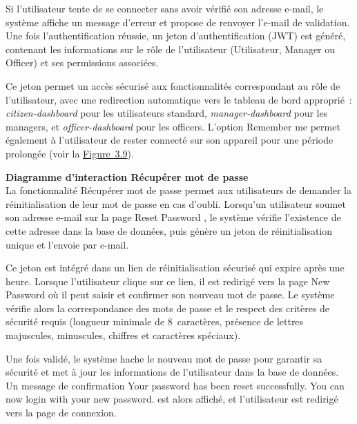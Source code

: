 \hspace{1em}Si l'utilisateur tente de se connecter sans avoir vérifié son adresse e-mail, le système affiche un message d'erreur et propose de renvoyer l'e-mail de validation. Une fois l'authentification réussie, un jeton d'authentification (JWT) est généré, contenant les informations sur le rôle de l'utilisateur (Utilisateur, Manager ou Officer) et ses permissions associées.

\hspace{1em}Ce jeton permet un accès sécurisé aux fonctionnalités correspondant au rôle de l'utilisateur, avec une redirection automatique vers le tableau de bord approprié~: \textit{citizen-dashboard} pour les utilisateurs standard, \textit{manager-dashboard} pour les managers, et \textit{officer-dashboard} pour les officers. L'option \og Remember me \fg{} permet également à l'utilisateur de rester connecté sur son appareil pour une période prolongée (voir la \hyperref[fig:3.9]{Figure~3.9}).

\medskip

\noindent\textbf{\textendash{} Diagramme d'interaction \og Récupérer mot de passe \fg{}}\\
\hspace{1em}La fonctionnalité \og Récupérer mot de passe \fg{} permet aux utilisateurs de demander la réinitialisation de leur mot de passe en cas d'oubli. Lorsqu'un utilisateur soumet son adresse e-mail sur la page \og Reset Password \fg{}, le système vérifie l'existence de cette adresse dans la base de données, puis génère un jeton de réinitialisation unique et l'envoie par e-mail.

\hspace{1em}Ce jeton est intégré dans un lien de réinitialisation sécurisé qui expire après une heure. Lorsque l'utilisateur clique sur ce lien, il est redirigé vers la page \og New Password \fg{} où il peut saisir et confirmer son nouveau mot de passe. Le système vérifie alors la correspondance des mots de passe et le respect des critères de sécurité requis (longueur minimale de 8~caractères, présence de lettres majuscules, minuscules, chiffres et caractères spéciaux).

\hspace{1em}Une fois validé, le système hache le nouveau mot de passe pour garantir sa sécurité et met à jour les informations de l'utilisateur dans la base de données. Un message de confirmation \og Your password has been reset successfully. You can now login with your new password. \fg{} est alors affiché, et l'utilisateur est redirigé vers la page de connexion.

